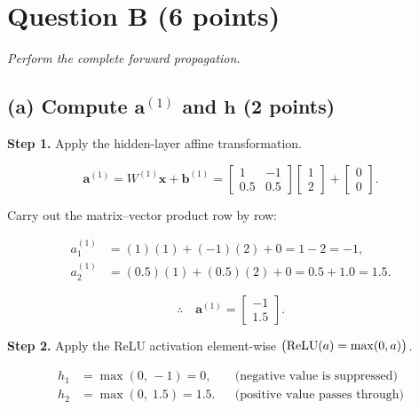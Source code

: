 \documentclass[12pt,a4paper]{article}
\newcommand{\step}[1]{\medskip\noindent\textbf{\textsf{Step #1.}}\enspace}
\begin{document}
\section*{Question B \hfill{\normalfont\small(6 points)}}

\noindent\textit{Perform the complete forward propagation.}

\bigskip
\subsection*{(a) Compute $\mathbf{a}^{(1)}$ and $\mathbf{h}$
             \hfill{\normalfont\small(2 points)}}

\step{1} Apply the hidden-layer affine transformation.

\[
  \mathbf{a}^{(1)}
  = W^{(1)}\mathbf{x} + \mathbf{b}^{(1)}
  = \begin{bmatrix} 1 & -1 \\ 0.5 & 0.5 \end{bmatrix}
    \begin{bmatrix} 1 \\ 2 \end{bmatrix}
  + \begin{bmatrix} 0 \\ 0 \end{bmatrix}.
\]

Carry out the matrix--vector product row by row:

\[
  \begin{aligned}
    a^{(1)}_1 &= (1)(1) + (-1)(2) + 0 = 1 - 2 = -1,\\[4pt]
    a^{(1)}_2 &= (0.5)(1) + (0.5)(2) + 0 = 0.5 + 1.0 = 1.5.
  \end{aligned}
\]

\[
  \therefore\quad
  \mathbf{a}^{(1)} = \begin{bmatrix} -1 \\ 1.5 \end{bmatrix}.
\]

\step{2} Apply the ReLU activation element-wise
         $\bigl(\operatorname{ReLU}(a) = \max(0,a)\bigr)$.

\[
  \begin{aligned}
    h_1 &= \max(0,\,-1) = 0,       & &\text{(negative value is suppressed)}\\
    h_2 &= \max(0,\;1.5) = 1.5.   & &\text{(positive value passes through)}
  \end{aligned}
\]
\end{document}
